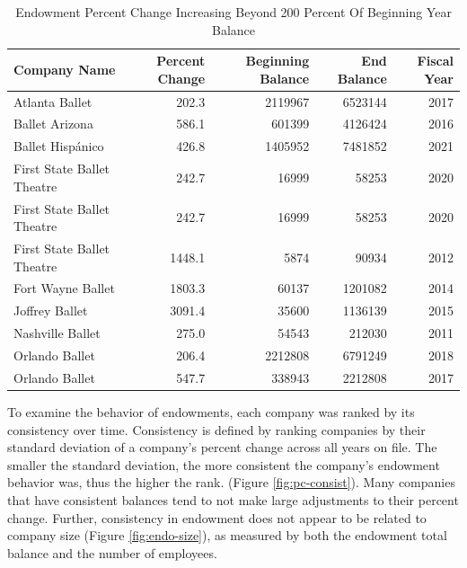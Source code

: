 \documentclass[Dance Data
Project,article,submit,moreauthors,pdftex]{mdpi}
\begin{document}
\begin{table}

\caption{Endowment Percent Change Increasing Beyond 200 Percent Of Beginning Year Balance}
\centering
\begin{tabular}[t]{lrrrr}
\toprule
Company Name & Percent Change & Beginning Balance & End Balance & Fiscal Year\\
\midrule
Atlanta Ballet & 202.3 & 2119967 & 6523144 & 2017\\
\addlinespace
Ballet Arizona & 586.1 & 601399 & 4126424 & 2016\\
\addlinespace
Ballet Hispánico & 426.8 & 1405952 & 7481852 & 2021\\
\addlinespace
First State Ballet Theatre & 242.7 & 16999 & 58253 & 2020\\
\addlinespace
First State Ballet Theatre & 242.7 & 16999 & 58253 & 2020\\
\addlinespace
First State Ballet Theatre & 1448.1 & 5874 & 90934 & 2012\\
\addlinespace
Fort Wayne Ballet & 1803.3 & 60137 & 1201082 & 2014\\
\addlinespace
Joffrey Ballet & 3091.4 & 35600 & 1136139 & 2015\\
\addlinespace
Nashville Ballet & 275.0 & 54543 & 212030 & 2011\\
\addlinespace
Orlando Ballet & 206.4 & 2212808 & 6791249 & 2018\\
\addlinespace
Orlando Ballet & 547.7 & 338943 & 2212808 & 2017\\
\bottomrule
\end{tabular}
\end{table}

To examine the behavior of endowments, each company was ranked by its
consistency over time. Consistency is defined by ranking companies by
their standard deviation of a company's percent change across all years
on file. The smaller the standard deviation, the more consistent the
company's endowment behavior was, thus the higher the rank. (Figure
\ref{fig:pc-consist}). Many companies that have consistent balances tend
to not make large adjustments to their percent change. Further,
consistency in endowment does not appear to be related to company size
(Figure \ref{fig:endo-size}), as measured by both the endowment total
balance and the number of employees.
\end{document}
